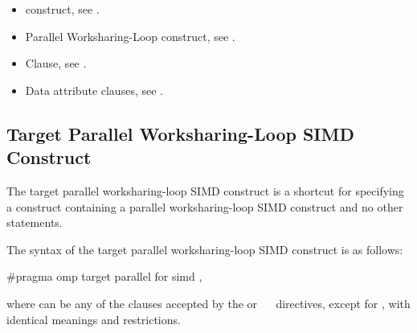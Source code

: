 \crossreferences
\begin{itemize}
\item {} construct, see
.

\item Parallel Worksharing-Loop construct, see
.

\item {} Clause, see .

\item Data attribute clauses, see
.

\end{itemize}










\subsection{Target Parallel Worksharing-Loop SIMD Construct}
\label{subsec:Target Parallel Worksharing-Loop SIMD Construct}
\summary
The target parallel worksharing-loop SIMD construct is a shortcut for specifying a 
construct containing a parallel worksharing-loop SIMD construct and no other statements.

\syntax
\begin{ccppspecific}
The syntax of the target parallel worksharing-loop SIMD construct is as follows:

\begin{ompcPragma}
#pragma omp target parallel for simd \plc{[clause[
[},\plc{] clause] ... ] new-line}
\end{ompcPragma}

where  can be any of the clauses accepted by the  or
~~ directives, except for , with identical meanings and restrictions.
\end{ccppspecific}

